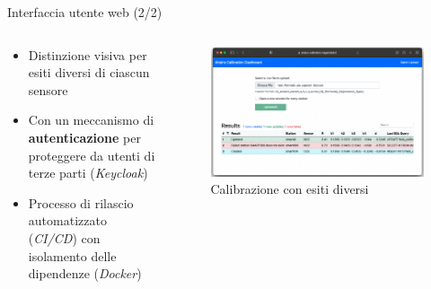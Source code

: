 \begin{frame}{Interfaccia utente web (2/2)}
\begin{columns}

\begin{column}{0.43\textwidth}

\begin{itemize}
  \item Distinzione visiva per esiti diversi di ciascun sensore
  \item Con un meccanismo di \textbf{autenticazione} per proteggere da utenti di terze parti (\textit{Keycloak})
  \item Processo di rilascio automatizzato (\textit{CI/CD}) con isolamento delle dipendenze (\textit{Docker})
\end{itemize}

\end{column}

\begin{column}{0.65\textwidth}

\begin{center}
\begin{figure}[H]
\centering
\captionsetup{justification=centering}
\includegraphics[width=\textwidth]{images/interfaccia_7}
\caption{Calibrazione con esiti diversi}
\end{figure}
\end{center}

\end{column}


\end{columns}
\end{frame}


